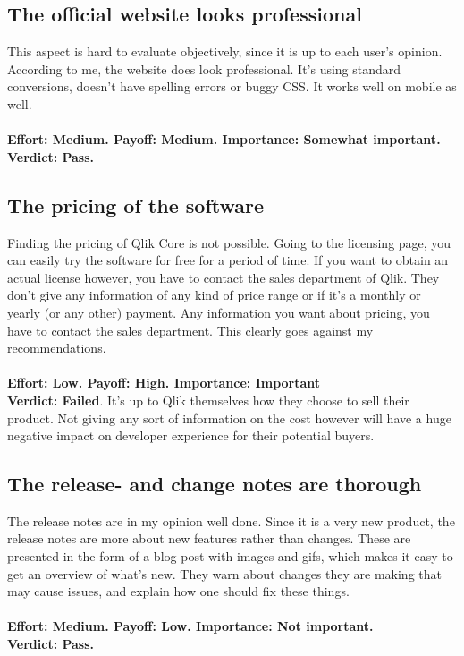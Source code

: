 \documentclass{cslthse-msc}
\begin{document}
    \subsection{The official website looks professional}
    This aspect is hard to evaluate objectively, since it is up to each user's opinion. According to me, the website does look professional. It's using standard conversions, doesn't have spelling errors or buggy CSS. It works well on mobile as well.\\ \\
    \textbf{Effort: Medium. Payoff: Medium. Importance: Somewhat important.}\\
    \textbf{Verdict: Pass.}
    \subsection{The pricing of the software}
    Finding the pricing of Qlik Core is not possible. Going to the licensing page, you can easily try the software for free for a period of time. If you want to obtain an actual license however, you have to contact the sales department of Qlik. They don't give any information of any kind of price range or if it's a monthly or yearly (or any other) payment. Any information you want about pricing, you have to contact the sales department. This clearly goes against my recommendations.\\ \\
    \textbf{Effort: Low. Payoff: High. Importance: Important}\\
    \textbf{Verdict: Failed}. It's up to Qlik themselves how they choose to sell their product. Not giving any sort of information on the cost however will have a huge negative impact on developer experience for their potential buyers.
    \subsection{The release- and change notes are thorough}
    The release notes are in my opinion well done. Since it is a very new product, the release notes are more about new features rather than changes. These are presented in the form of a blog post with images and gifs, which makes it easy to get an overview of what's new. They warn about changes they are making that may cause issues, and explain how one should fix these things.\\ \\
    \textbf{Effort: Medium. Payoff: Low. Importance: Not important.}\\
    \textbf{Verdict: Pass.}
\end{document}
